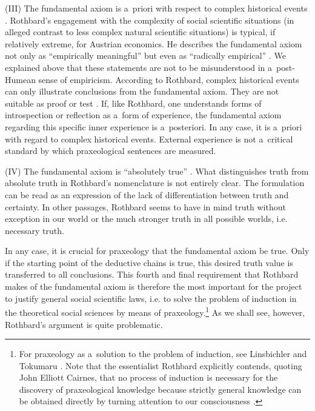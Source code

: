 (III) The fundamental axiom is a~priori with respect to complex historical events 
\parencites[][p.318]{rothbard_defense_1957}[][p.25]{rothbard_praxeology:_1976}. %
 Rothbard's engagement with the complexity of social scientific situations (in alleged contrast to less complex natural scientific situations) is typical, if relatively extreme, for Austrian economics. He describes the fundamental axiom not only as ``empirically meaningful'' but even as ``radically empirical'' 
\parencite[][p.24]{rothbard_praxeology:_1976}. %
 We explained above that these statements are not to be misunderstood in a~post-Humean sense of empiricism. According to Rothbard, complex historical events can only illustrate conclusions from the fundamental axiom. They are not suitable as proof or test 
\parencites[][p.181]{rothbard_mises_1951}[][pp.944–945]{rothbard_praxeology_1951}. %
 If, like Rothbard, one understands forms of introspection or reflection as a~form of experience, the fundamental axiom regarding this specific inner experience is a~posteriori. In any case, it is a~priori with regard to complex historical events. External experience is not a~critical standard by which praxeological sentences are measured.



(IV) The fundamental axiom is ``absolutely true'' 
\parencite[][pp.314]{}. %
 What distinguishes truth from absolute truth in Rothbard's nomenclature is not entirely clear. The formulation can be read as an expression of the lack of differentiation between truth and certainty. In other passages, Rothbard seems to have in mind truth without exception in our world or the much stronger truth in all possible worlds, i.e. necessary truth.



In any case, it is crucial for praxeology that the fundamental axiom be true. Only if the starting point of the deductive chains is true, this desired truth value is transferred to all conclusions. This fourth and final requirement that Rothbard makes of the fundamental axiom is therefore the most important for the project to justify general social scientific laws, i.e. to solve the problem of induction in the theoretical social sciences by means of praxeology.\footnote{For praxeology as a~solution to the problem of induction, see Linsbichler 
\parencite*[][]{linsbichler_was_2017} %
 and Tokumaru 
\parencite*[][]{}. %
 Note that the essentialist Rothbard explicitly contends, quoting John Elliott Cairnes, that no process of induction is necessary for the discovery of praxeological knowledge because strictly general knowledge can be obtained directly by turning attention to our consciousness 
\parencite[][pp.65–68]{rothbard_praxeology_2011}.%
} As we shall see, however, Rothbard's argument is quite problematic.



